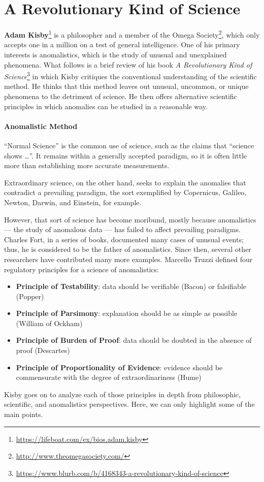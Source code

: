 \section{A Revolutionary Kind of Science}
\label{sec:202207_07A Revolutionary Kind of Science}

\textbf{Adam Kisby}\footnote{\url{https://lifeboat.com/ex/bios.adam.kisby}} is a philosopher and a member of the Omega Society\footnote{\url{http://www.theomegasociety.com/}}, which only accepts one in a million on a test of
general intelligence. One of his primary interests is anomalistics, which is the study of unusual and unexplained
phenomena. What follows is a brief review of his book \textit{A Revolutionary Kind of Science}\footnote{\url{https://www.blurb.com/b/4168343-a-revolutionary-kind-of-science}} in which Kisby critiques the
conventional understanding of the scientific method. He thinks that this method leaves out unusual, uncommon, or unique
phenomena to the detriment of science. He then offers alternative scientific principles in which anomalies can be
studied in a reasonable way.

\paragraph{Anomalistic Method}
“Normal Science” is the common use of science, such as the claims that “science shows …”. It remains within a generally
accepted paradigm, so it is often little more than establishing more accurate measurements.

Extraordinary science, on the other hand, seeks to explain the anomalies that contradict a prevailing paradigm, the sort
exemplified by Copernicus, Galileo, Newton, Darwin, and Einstein, for example.

However, that sort of science has become moribund, mostly because anomalistics — the study of anomalous data
— has failed to affect prevailing paradigms. Charles Fort, in a series of books, documented many cases of
unusual events; thus, he is considered to be the father of anomalistics. Since then, several other researchers have
contributed many more examples. Marcello Truzzi defined four regulatory principles for a science of anomalistics:

\begin{itemize}
\item \textbf{Principle of Testability}: data should be verifiable (Bacon) or falsifiable (Popper) 
\item \textbf{Principle of Parsimony}: explanation should be as simple as possible (William of Ockham) 
\item \textbf{Principle of Burden of Proof}: data should be doubted in the absence of proof (Descartes) 
\item \textbf{Principle of Proportionality of Evidence}: evidence should be commensurate with the degree of
extraordinariness (Hume) 
\end{itemize}
Kisby goes on to analyze each of those principles in depth from philosophic, scientific, and anomalistics perspectives.
Here, we can only highlight some of the main points.

